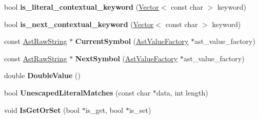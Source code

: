 \begin{DoxyCompactItemize}
\item 
\hypertarget{classv8_1_1internal_1_1_scanner_aeb40107bd95ec784e9ea6e2c3e229416}{}bool {\bfseries is\+\_\+literal\+\_\+contextual\+\_\+keyword} (\hyperlink{classv8_1_1internal_1_1_vector}{Vector}$<$ const char $>$ keyword)\label{classv8_1_1internal_1_1_scanner_aeb40107bd95ec784e9ea6e2c3e229416}

\item 
\hypertarget{classv8_1_1internal_1_1_scanner_a3cf6896bdc143e71b4fa069e707c3a03}{}bool {\bfseries is\+\_\+next\+\_\+contextual\+\_\+keyword} (\hyperlink{classv8_1_1internal_1_1_vector}{Vector}$<$ const char $>$ keyword)\label{classv8_1_1internal_1_1_scanner_a3cf6896bdc143e71b4fa069e707c3a03}

\item 
\hypertarget{classv8_1_1internal_1_1_scanner_afe0444bbc19a257cf11e79c1dd6c2c60}{}const \hyperlink{classv8_1_1internal_1_1_ast_raw_string}{Ast\+Raw\+String} $\ast$ {\bfseries Current\+Symbol} (\hyperlink{classv8_1_1internal_1_1_ast_value_factory}{Ast\+Value\+Factory} $\ast$ast\+\_\+value\+\_\+factory)\label{classv8_1_1internal_1_1_scanner_afe0444bbc19a257cf11e79c1dd6c2c60}

\item 
\hypertarget{classv8_1_1internal_1_1_scanner_ad16b079af6f99fcb6709a47e638ef105}{}const \hyperlink{classv8_1_1internal_1_1_ast_raw_string}{Ast\+Raw\+String} $\ast$ {\bfseries Next\+Symbol} (\hyperlink{classv8_1_1internal_1_1_ast_value_factory}{Ast\+Value\+Factory} $\ast$ast\+\_\+value\+\_\+factory)\label{classv8_1_1internal_1_1_scanner_ad16b079af6f99fcb6709a47e638ef105}

\item 
\hypertarget{classv8_1_1internal_1_1_scanner_a86409d59b79b3685549d19b810471f92}{}double {\bfseries Double\+Value} ()\label{classv8_1_1internal_1_1_scanner_a86409d59b79b3685549d19b810471f92}

\item 
\hypertarget{classv8_1_1internal_1_1_scanner_a5c53152d985b1277f58fe1873d8c896d}{}bool {\bfseries Unescaped\+Literal\+Matches} (const char $\ast$data, int length)\label{classv8_1_1internal_1_1_scanner_a5c53152d985b1277f58fe1873d8c896d}

\item 
\hypertarget{classv8_1_1internal_1_1_scanner_a4d10c13a3043358f6a6c224ac8e4685f}{}void {\bfseries Is\+Get\+Or\+Set} (bool $\ast$is\+\_\+get, bool $\ast$is\+\_\+set)\label{classv8_1_1internal_1_1_scanner_a4d10c13a3043358f6a6c224ac8e4685f}


\end{DoxyCompactItemize}
